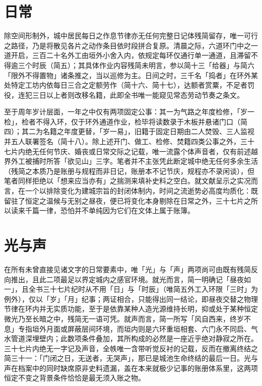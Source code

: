 \section{日常}

除空间形制外，城中居民每日之作息节律亦无任何完整日记体残简留存，唯一可行之路径，乃是将散见各片之动作条目依时段拼合复原。清晨之际，六道环门中之一道开启，三百二十名外工由垣外小舍入内，依规定每环仅通行单一通道，且滞留不得逾三个时辰（简五）；其具体作业内容残简未明言，参以简十三「给器」与简六「限外不得置物」诸条推之，当以巡修为主。日间之时，三千名「捣者」在环外某处特定工坊内依每日三合之定额劳作（简十六、简十七），达额者赏粟，不足者罚役，连犯三日以上者则改移名籍，此即全书唯一能窥见常态劳动节奏之条文。

至于周年岁计层面，一年之中仅有两项固定公事：其一为气路之年度检修，「岁一检」，检者不得入环，仅于环外通道作业，检毕将读数录于木板并悬诸门口（简四）；其二为名籍之年度更替，「岁一易」，旧籍于固定日期由二人焚毁、三人监视并五人联署签名（简十八）。除上述开门、做工、检修、焚籍四类公事之外，三十七片内绝无任何节庆、婚丧或日常交际之记载，唯一流露个体声音者，仅有前述越界外工被捕时所答「欲见山」三字。笔者并不主张凭此断定城中绝无任何多余生活（残简之本质乃是账册与规程而非日记，账册本不记节庆，规程亦不录闲谈），但笔者同样拒绝以「想来应当亦有」之揣测来填补史料之空白。就文献呈示之实况而言，在一个以排除变化为建城宗旨的封闭体制内，时间之流逝势必高度均质化：既留驻了恒定之温候与无别之昼夜，便已将变化本身剔除在日常之外，三十七片之所以读来千篇一律，恐怕并不单纯因为它们在文体上属于账簿。

\section{光与声}

在所有未曾直接见诸文字的日常要素中，唯「光」与「声」两项尚可由既有残简反向推出，且此二项最足以界定城内之感官环境。就光而言，简一明确记「昼夜如一」，且全书三十七片纪时从不用「日」与「时辰」（唯简五外工入环限「三时」为例外），仅以「岁」「月」纪事；两证相合，只能得出同一结论，即昼夜交替之物理节律在环内并无实质功能，至于是依靠某种人造光源维持长明，抑或处于某种恒定微光乃至长暗之中，残简无一语可凭。就声而言，简一所写「风自西来，终岁不息」专指垣外月面或屏蔽层间环境，而垣内则是六环重垣相套、六门永不同启、气水管道深埋壁内；此数项条件叠加，其所构成的必然是一座近乎绝对静寂之所在。三十七片内绝无一字记及声音，全帙唯一含带听觉反衬的记载，反而在撤离终结之简三十一：「门闭之日，无送者，无哭声」，那已是城池生命终结的最后一日。光与声在档案中的同时缺席原非史料遗漏，盖在本来就极少记事的账册体系里，这两项恒定不变之背景条件恰恰是最无须入账之物。


